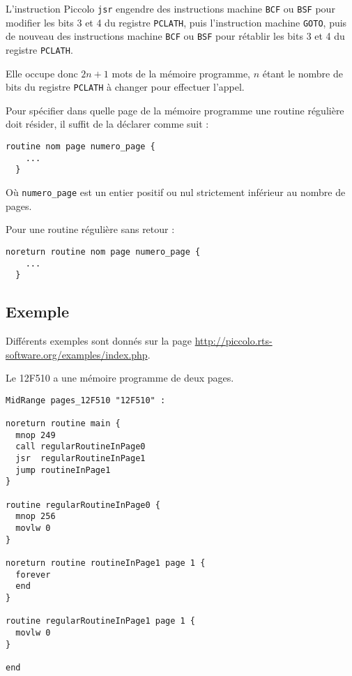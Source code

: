 
L'instruction Piccolo  \texttt{jsr} engendre des instructions machine \texttt{BCF} ou \texttt{BSF} pour modifier les bits 3 et 4 du registre \texttt{PCLATH}, puis l'instruction machine \texttt{GOTO}, puis de nouveau des instructions machine \texttt{BCF} ou \texttt{BSF} pour rétablir les bits 3 et 4 du registre \texttt{PCLATH}.

Elle occupe donc $2n+1$ mots de la mémoire programme, $n$ étant le nombre de bits du registre \texttt{PCLATH} à changer pour effectuer l'appel.


Pour spécifier dans quelle page de la mémoire programme une routine régulière doit résider, il suffit de la déclarer comme suit :
\begin{lstlisting}[language=piccolo]
  routine nom page numero_page {
    ...
  }
\end{lstlisting}

Où \texttt{numero\_page} est un entier positif ou nul strictement inférieur au nombre de pages.

Pour une routine régulière sans retour :
\begin{lstlisting}[language=piccolo]
  noreturn routine nom page numero_page {
    ...
  }
\end{lstlisting}

\subsection{Exemple}

Différents exemples sont donnés sur la page \url{http://piccolo.rts-software.org/examples/index.php}.

Le 12F510 a une mémoire programme de deux pages. 

\begin{lstlisting}[language=piccolo]
MidRange pages_12F510 "12F510" :

noreturn routine main {
  mnop 249
  call regularRoutineInPage0
  jsr  regularRoutineInPage1
  jump routineInPage1
}

routine regularRoutineInPage0 {
  mnop 256
  movlw 0
}

noreturn routine routineInPage1 page 1 {
  forever
  end
}

routine regularRoutineInPage1 page 1 {
  movlw 0
}

end
\end{lstlisting}

